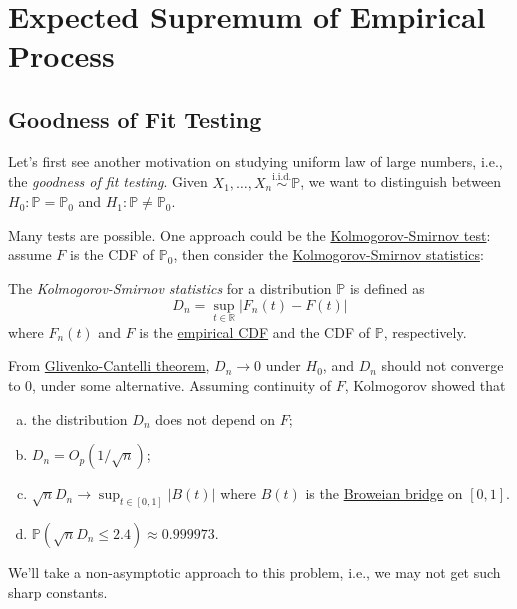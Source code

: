\chapter{Expected Supremum of Empirical Process}
\section{Goodness of Fit Testing}
Let's first see another motivation on studying uniform law of large numbers, i.e., the \emph{goodness of fit testing}. Given \(X_1, \dots , X_n \overset{\text{i.i.d.}}{\sim } \mathbb{P} \), we want to distinguish between \(H_0 \colon \mathbb{P} = \mathbb{P} _0\) and \(H_1\colon \mathbb{P} \neq \mathbb{P} _0\).

Many tests are possible. One approach could be the \href{https://en.wikipedia.org/wiki/Kolmogorov-Smirnov_test}{Kolmogorov-Smirnov test}: assume \(F\) is the CDF of \(\mathbb{P} _0\), then consider the \hyperref[def:Kolmogorov-Smirnov-statistics]{Kolmogorov-Smirnov statistics}:

\begin{definition}\label{def:Kolmogorov-Smirnov-statistics}
	The \emph{Kolmogorov-Smirnov statistics} for a distribution \(\mathbb{P} \) is defined as
	\[
		D_n = \sup _{t\in \mathbb{R} } \vert F_n(t) - F(t) \vert
	\]
	where \(F_n(t)\) and \(F\) is the \hyperref[def:empirical-CDF]{empirical CDF} and the CDF of \(\mathbb{P} \), respectively.
\end{definition}

From \href{https://en.wikipedia.org/wiki/Glivenko-Cantelli_theorem}{Glivenko-Cantelli theorem}, \(D_n \to 0\) under \(H_0\), and \(D_n\) should not converge to \(0\), under some alternative. Assuming continuity of \(F\), Kolmogorov showed that
\begin{enumerate}[(a)]
	\item the distribution \(D_n\) does not depend on \(F\);
	\item \(D_n = O_p(1 / \sqrt{n} )\);
	\item \(\sqrt{n} D_n \to \sup _{t\in [0, 1]} \vert B(t) \vert \) where \(B(t)\) is the \href{https://en.wikipedia.org/wiki/Brownian_bridge}{Broweian bridge} on \([0, 1]\).
	\item \(\mathbb{P} (\sqrt{n}D_n  \leq 2.4) \approx 0.999973\).
\end{enumerate}
We'll take a non-asymptotic approach to this problem, i.e., we may not get such sharp constants.

